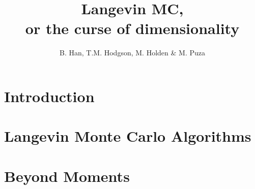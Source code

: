 \documentclass[a4paper]{article}
\title{Langevin MC, \\
  \large or the curse of dimensionality}
\author{B. Han, T.M. Hodgson, M. Holden \& M. Puza}
\theoremstyle{definition}
\begin{document}
	\maketitle
	\tableofcontents
	\section{Introduction}
	
	\section{Langevin Monte Carlo Algorithms}
	

	\section{Beyond Moments}
	


	
	
\end{document}
